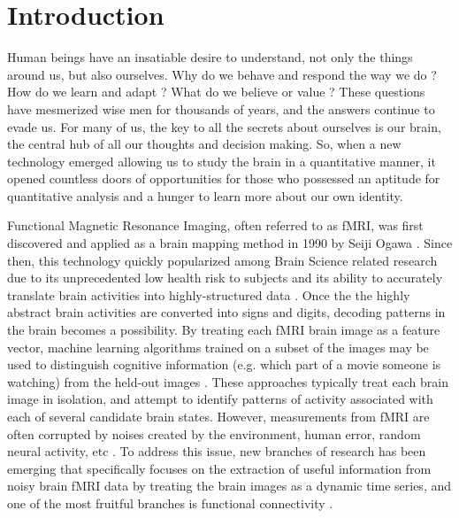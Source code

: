 \documentclass[11pt]{article}
\begin{document}
\section{Introduction}
Human beings have an insatiable desire to understand, not only the things around us, but also ourselves. Why do we behave and respond the way we do \cite{hasson2012}? How do we learn and adapt \cite{hasson2004}\cite{hasson2005}? What do we believe or value \cite{Greene01}? These questions have mesmerized wise men for thousands of years, and the answers continue to evade us. For many of us, the key to all the secrets about ourselves is our brain, the central hub of all our thoughts and decision making. So, when a new technology emerged allowing us to study the brain in a quantitative manner, it opened countless doors of opportunities for those who possessed an aptitude for quantitative analysis and a hunger to learn more about our own identity.

Functional Magnetic Resonance Imaging, often referred to as fMRI, was first discovered and applied as a brain mapping method in 1990 by Seiji Ogawa \cite{Ogawa90}. Since then, this technology quickly popularized among Brain Science related research due to its unprecedented low health risk to subjects and its ability to accurately translate brain activities into highly-structured data \cite{Logothetis01}. Once the the highly abstract brain activities are converted into signs and digits, decoding patterns in the brain becomes a possibility. By treating each fMRI brain image as a feature vector, machine learning algorithms trained on a subset of the images may be used to distinguish cognitive information (e.g. which part of a movie someone is watching) from the held-out images \cite{Norman06}\cite{peterson12}\cite{peterson17}. These approaches typically treat each brain image in isolation, and attempt to identify patterns of activity associated with each of several candidate brain states. However, measurements from fMRI are often corrupted by noises created by the environment, human error, random neural activity, etc \cite{peterson11}. To address this issue, new branches of research has been emerging that specifically focuses on the extraction of useful information from noisy brain fMRI data by treating the brain images as a dynamic time series, and one of the most fruitful branches is functional connectivity \cite{peterson9} \cite{peterson19} \cite{peterson20}.
\end{document}
